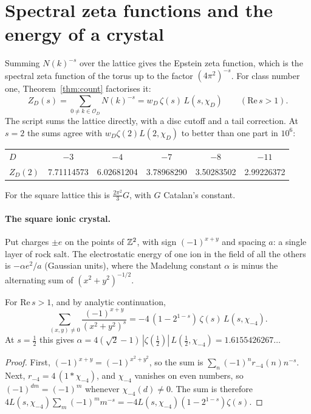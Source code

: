 \documentclass[11pt]{article}
\begin{document}
\section{Spectral zeta functions and the energy of a crystal}

Summing $N(k)^{-s}$ over the lattice gives the Epstein zeta function, which is the spectral zeta function of the torus up to the factor $(4\pi^2)^{-s}$.
For class number one, Theorem~\ref{thm:count} factorises it:
\[
  Z_D(s) = \sum_{0\ne k\in\mathcal O_D} N(k)^{-s} = w_D\,\zeta(s)\,L(s,\chi_D)\qquad(\mathrm{Re}\,s>1).
\]
The script sums the lattice directly, with a disc cutoff and a tail correction.
At $s=2$ the sums agree with $w_D\zeta(2)L(2,\chi_D)$ to better than one part in $10^{6}$:

\begin{center}
\begin{tabular}{@{}lccccc@{}}
\toprule
$D$ & $-3$ & $-4$ & $-7$ & $-8$ & $-11$\\
$Z_D(2)$ & 7.71114573 & 6.02681204 & 3.78968290 & 3.50283502 & 2.99226372\\
\bottomrule
\end{tabular}
\end{center}

\noindent
For the square lattice this is $\tfrac{2\pi^2}{3}G$, with $G$ Catalan's constant.

\paragraph{The square ionic crystal.}
Put charges $\pm e$ on the points of $\mathbb{Z}^2$, with sign $(-1)^{x+y}$ and spacing $a$: a single layer of rock salt.
The electrostatic energy of one ion in the field of all the others is $-\alpha e^2/a$ (Gaussian units), where the Madelung constant $\alpha$ is minus the alternating sum of $(x^2+y^2)^{-1/2}$.

\begin{proposition}\label{prop:madelung}
For $\mathrm{Re}\,s>1$, and by analytic continuation,
\[
  \sum_{(x,y)\ne0}\frac{(-1)^{x+y}}{(x^2+y^2)^s} = -4\,(1-2^{1-s})\,\zeta(s)\,L(s,\chi_{-4}).
\]
At $s=\frac12$ this gives $\alpha = 4(\sqrt2-1)\,|\zeta(\tfrac12)|\,L(\tfrac12,\chi_{-4}) = 1.6155426267\ldots$
\end{proposition}

\begin{proof}
First, $(-1)^{x+y} = (-1)^{x^2+y^2}$, so the sum is $\sum_n (-1)^n r_{-4}(n) n^{-s}$.
Next, $r_{-4} = 4\,(1*\chi_{-4})$, and $\chi_{-4}$ vanishes on even numbers, so $(-1)^{dm} = (-1)^m$ whenever $\chi_{-4}(d)\neq 0$.
The sum is therefore $4L(s,\chi_{-4})\sum_m(-1)^m m^{-s} = -4L(s,\chi_{-4})(1-2^{1-s})\zeta(s)$.
\end{proof}
\end{document}
